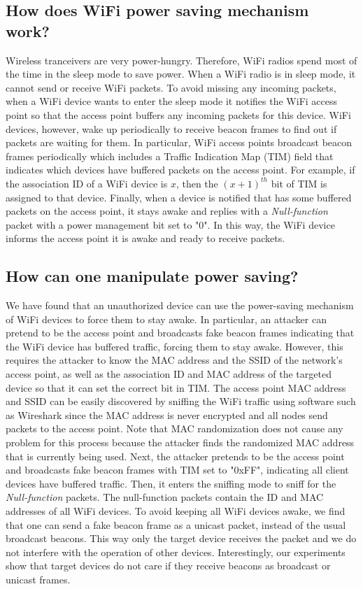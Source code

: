 \subsection{How does WiFi power saving mechanism work?}
Wireless tranceivers are very power-hungry. %
Therefore, WiFi radios spend most of the time in the sleep mode to save power. When a WiFi radio is in sleep mode, it cannot send or receive WiFi packets. To avoid missing any incoming packets, when a WiFi device wants to enter the sleep mode it notifies the WiFi access point so that the access point buffers any incoming packets for this device. WiFi devices, however, wake up periodically to receive beacon frames to find out if packets are waiting for them. In particular,  WiFi access points broadcast beacon frames periodically which includes a Traffic Indication Map (TIM) field that indicates which devices have buffered packets on the access point. For example, if the association ID of a WiFi device is $x$, then the $(x+1)^{th}$ bit of TIM is assigned to that device. Finally, when a device is notified that has some buffered packets on the access point, it stays awake and replies with a \textit{Null-function} packet with a power management bit set to "0". In this way, the WiFi device informs the access point it is awake and ready to receive packets.

\subsection{How can one manipulate power saving?}
We have found that an unauthorized device can use the power-saving mechanism of WiFi devices to force them to stay awake. In particular, an attacker can pretend to be the access point and broadcasts fake beacon frames indicating that the WiFi device has buffered traffic, forcing them to stay awake. However, this requires the attacker to know the MAC address and the SSID of the network's access point, as well as the association ID and MAC address of the targeted device so that it can set the correct bit in TIM. 
The access point MAC address and SSID can be easily discovered by sniffing the WiFi traffic using software such as Wireshark since the MAC address is never encrypted and all nodes send packets to the access point. 
Note that MAC randomization does not cause any problem for this process because the attacker finds the randomized MAC address that is currently being used.
Next, the attacker pretends to be the access point and broadcasts fake beacon frames with TIM set to "0xFF", indicating all client devices have buffered traffic. Then, it enters the sniffing mode to sniff for the \textit{Null-function} packets. The null-function packets contain the ID and MAC addresses of all WiFi devices. To avoid keeping all WiFi devices awake, we find that one can send a fake beacon frame as a unicast packet, instead of the usual broadcast beacons. This way only the target device receives the packet and we do not interfere with the operation of other devices. Interestingly, our experiments show that target devices do not care if they receive beacons as broadcast or unicast frames.

